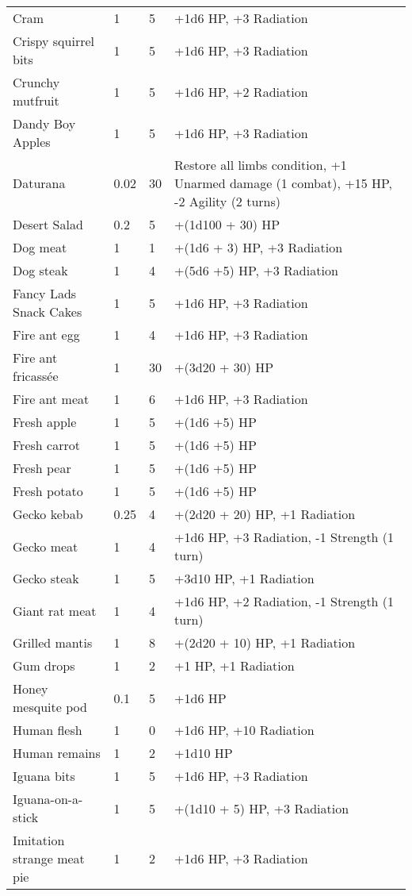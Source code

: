 \begin{longtable}{|p{4cm}|p{1.5cm}|p{1.5cm}|p{9cm}|}
Cram  & 1 & 5 & +1d6 HP, +3 Radiation \\
Crispy squirrel bits  & 1 & 5 & +1d6 HP, +3 Radiation \\
Crunchy mutfruit  & 1 & 5 & +1d6 HP, +2 Radiation \\
Dandy Boy Apples  & 1 & 5 & +1d6 HP, +3 Radiation \\
Daturana  & 0.02  & 30 & Restore all limbs condition, +1 Unarmed damage (1 combat), +15 HP, -2 Agility (2 turns)   \\
Desert Salad  & 0.2  & 5 & +(1d100 + 30) HP \\
Dog meat  & 1 & 1 & +(1d6 + 3) HP, +3 Radiation \\
Dog steak  & 1 & 4 & +(5d6 +5) HP, +3 Radiation \\
Fancy Lads Snack Cakes  & 1 & 5 & +1d6 HP, +3 Radiation \\
Fire ant egg  & 1 & 4 & +1d6 HP, +3 Radiation \\
Fire ant fricassée  & 1 & 30 & +(3d20 + 30) HP   \\
Fire ant meat  & 1 & 6 & +1d6 HP, +3 Radiation \\
Fresh apple  & 1 & 5 & +(1d6 +5) HP \\
Fresh carrot  & 1 & 5 & +(1d6 +5) HP \\
Fresh pear  & 1 & 5 & +(1d6 +5) HP \\
Fresh potato  & 1 & 5 & +(1d6 +5) HP \\
Gecko kebab  & 0.25  & 4 & +(2d20 + 20) HP, +1 Radiation \\
Gecko meat  & 1 & 4 & +1d6 HP, +3 Radiation, -1 Strength (1 turn) \\
Gecko steak  & 1 & 5 & +3d10 HP, +1 Radiation \\
Giant rat meat  & 1 & 4 & +1d6 HP, +2 Radiation, -1 Strength (1 turn) \\
Grilled mantis  & 1 & 8 & +(2d20 + 10) HP, +1 Radiation \\
Gum drops  & 1 & 2 & +1 HP, +1 Radiation \\
Honey mesquite pod  & 0.1  & 5 & +1d6 HP \\
Human flesh  & 1 & 0 & +1d6 HP, +10 Radiation \\
Human remains  & 1 & 2 & +1d10 HP \\
Iguana bits  & 1 & 5 & +1d6 HP, +3 Radiation \\
Iguana-on-a-stick  & 1 & 5 & +(1d10 + 5) HP, +3 Radiation \\
Imitation strange meat pie  & 1 & 2 & +1d6 HP, +3 Radiation \\

\end{longtable}
